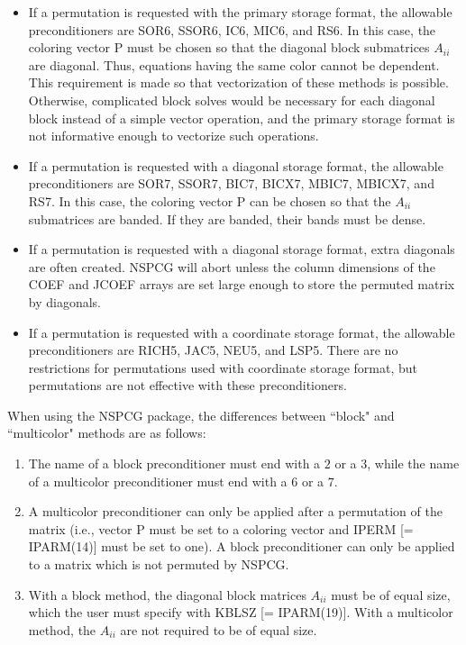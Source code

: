 \begin{itemize}

  \item If a permutation is requested with the primary storage
        format, the allowable preconditioners are SOR6, SSOR6,
        IC6, MIC6, and RS6.  In this case, the coloring vector P 
        must be chosen so that the diagonal block submatrices 
        $A_{ii}$ are diagonal.  Thus, equations having the same 
        color cannot be dependent.  This requirement is made so 
        that vectorization of these methods is possible.  Otherwise, 
        complicated block solves would be necessary for each 
        diagonal block instead of a simple vector operation,
        and the primary storage format is not informative enough 
        to vectorize such operations.
 
  \item If a permutation is requested with a diagonal storage
        format, the allowable preconditioners are SOR7, SSOR7,
        BIC7, BICX7, MBIC7, MBICX7, and RS7.  In this case,
        the coloring vector P can be chosen so that the $A_{ii}$ 
        submatrices are banded.  If they are banded, their
        bands must be dense.
 
  \item If a permutation is requested with a diagonal storage 
        format, extra diagonals are often created.  NSPCG will
        abort unless the column dimensions of the COEF and JCOEF 
        arrays are set large enough to store the permuted matrix
        by diagonals.
     
  \item If a permutation is requested with a coordinate storage
        format, the allowable preconditioners are RICH5, JAC5,
        NEU5, and LSP5.  There are no restrictions for permutations 
        used with coordinate storage format, but permutations
        are not effective with these preconditioners.
\end{itemize}

When using the NSPCG package, the differences between ``block" and 
``multicolor" methods are as follows:
\begin{enumerate}
 \item  The name of a block preconditioner must end with a $2$ or
        a $3$, while the name of a multicolor preconditioner must
        end with a $6$ or a $7$.

 \item  A multicolor preconditioner can only be applied after a
        permutation of the matrix (i.e., vector P must be set to a
        coloring vector and IPERM [= IPARM(14)] must be set to one).
        A block preconditioner can only be applied to a matrix
        which is not permuted by NSPCG.

 \item  With a block method, the diagonal block matrices 
        $A_{ii}$ must be of equal size, which the user must
        specify with KBLSZ [= IPARM(19)].  With a multicolor
        method, the $A_{ii}$ are not required to be of equal
        size.
\end{enumerate}

